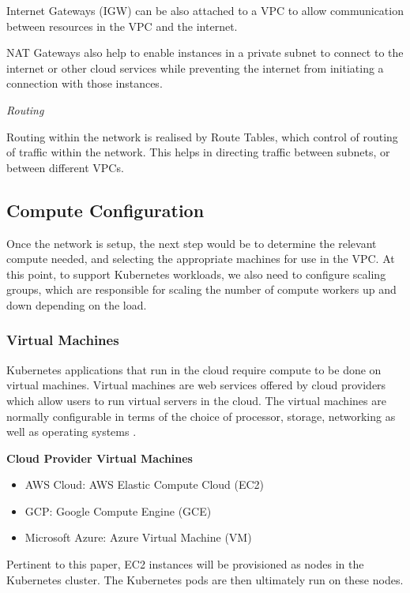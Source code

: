 Internet Gateways (IGW) can be also attached to a VPC to allow communication between resources in the VPC and the internet. 

NAT Gateways also help to enable instances in a private subnet to connect to the internet or other cloud services while preventing the internet from initiating a connection with those instances. 

\textit{Routing}

Routing within the network is realised by Route Tables, which control of routing of traffic within the network. This helps in directing traffic between subnets, or between different VPCs.




\subsection{Compute Configuration}
Once the network is setup, the next step would be to determine the relevant compute needed, and selecting the appropriate machines for use in the VPC. At this point, to support
Kubernetes workloads, we also need to configure scaling groups, which are responsible for scaling the number of compute workers up and down depending on the load. 

\subsubsection{Virtual Machines}
Kubernetes applications that run in the cloud require compute to be done on virtual machines. Virtual machines are web services offered by cloud providers which allow users to run virtual servers in the cloud. The virtual machines are normally configurable in terms of the choice of processor, storage, networking as well as operating systems \cite{vmware-no-date}. 

\textbf{Cloud Provider Virtual Machines}

\begin{itemize}
    \vspace{-1em}
\item AWS Cloud: AWS Elastic Compute Cloud (EC2)
\item GCP: Google Compute Engine (GCE)
\item Microsoft Azure: Azure Virtual Machine (VM)
\end{itemize}

Pertinent to this paper, EC2 instances will be provisioned as nodes in the Kubernetes cluster. The Kubernetes pods are then ultimately run on these nodes.

